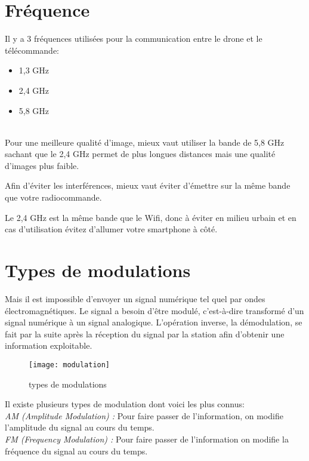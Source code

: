    

\section{Fréquence}

Il y a 3 fréquences utilisées pour la communication entre le drone et le télécommande: ~\\
\begin{itemize}
\item 1,3 GHz
\item    2,4 GHz 
\item    5,8 GHz 
\end{itemize}  
~\\


Pour une meilleure qualité d’image, mieux vaut utiliser la bande de 5,8 GHz sachant que le 2,4 GHz permet de plus longues distances mais une qualité d’images plus faible. 

Afin d’éviter les interférences, mieux vaut éviter d’émettre sur la même bande que votre radiocommande. 

Le 2,4 GHz est la même bande que le Wifi, donc à éviter en milieu urbain et en cas d’utilisation évitez d’allumer votre smartphone à côté. 

\section{Types de modulations }

Mais il est impossible d’envoyer un signal numérique tel quel par ondes électromagnétiques. Le signal a besoin d’être modulé, c'est-à-dire transformé d’un signal numérique à un signal analogique. L’opération inverse, la démodulation, se fait par la suite après la réception du signal par la station afin d’obtenir une information exploitable. 

 
\begin{figure}[h]
  \centering
  \texttt{[image: modulation]}
  \caption{types de modulations}
\end{figure}
 


Il existe plusieurs types de modulation dont voici les plus connus: ~\\

 
\textit{AM (Amplitude Modulation) :} Pour faire passer de l’information, on modifie l’amplitude du signal au cours du temps. ~\\

 

\textit{FM (Frequency Modulation) :} Pour faire passer de l’information on modifie la fréquence du signal au cours du temps. ~\\

